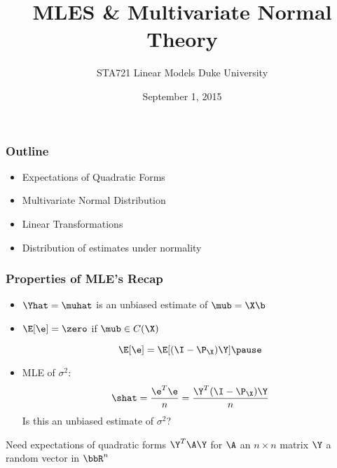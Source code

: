 \documentclass[handout]{beamer}
\title{MLES  \& Multivariate Normal Theory}
\institute{Merlise Clyde}
\author{STA721 Linear Models Duke University}
\date{September 1, 2015}
\begin{document}
\maketitle

\begin{frame} \frametitle{Outline}
  
  \begin{itemize}
  \item Expectations of Quadratic Forms
  \item Multivariate Normal Distribution
  \item Linear Transformations 
  \item Distribution of estimates under normality
  \end{itemize}
\end{frame}

\begin{frame}
  \frametitle{Properties of MLE's Recap}
  \begin{itemize}
  \item 
 $\Yhat = \muhat$ is an unbiased estimate of $\mub = \X\b$
\pause
\item $\E[\e] = \zero$ if $\mub \in C(\X)$ \pause

$$      \E [ \e ]   =  \E [(\I - \P_\X) \Y ] \pause
$$
\item MLE of $\sigma^2$:
  $$\shat = \frac{\e^T\e}{n} = \frac{\Y^T (\I - \P_\X) \Y}{n}$$
\pause
Is this an unbiased estimate of $\sigma^2$?
  \end{itemize}
\pause
Need expectations  of quadratic forms $\Y^T \A \Y$ for $\A$ an
 $n \times n$ matrix $\Y$ a random vector in $\bbR^n$
\end{frame}
\end{document}
